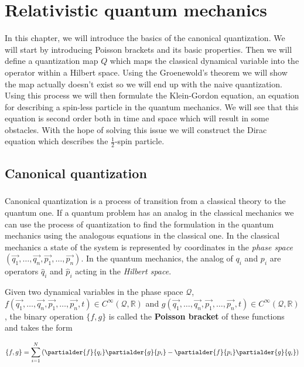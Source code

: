 \chapter{Relativistic quantum mechanics}

In this chapter, we will introduce the basics of the canonical quantization. We will start by introducing
Poisson brackets and its basic properties. Then we will define a quantization map $Q$ which maps the
classical dynamical variable into the operator within a Hilbert space. Using the Groenewold's theorem we
will show the map actually doesn't exist so we will end up with the naive quantization. Using this process we will then
formulate the Klein-Gordon equation, an equation for describing a spin-less particle in the quantum mechanics.
We will see that this equation is second order both in time and space which will result in some obstacles. With the
hope of solving this issue we will construct the Dirac equation which describes the $\frac{1}{2}$-spin particle.

\section{Canonical quantization}

\paragraph{} Canonical quantization is a process of transition from a classical theory to the quantum one. If a 
quantum problem has an analog in the classical mechanics we can use the process of quantization to find the formulation
in the quantum mechanics using the analogous equations in the classical one. In the classical mechanics a state of the system
is represented by coordinates in the \textit{phase space} $(\vec{q_{1}}, \dots, \vec{q_{n}}, \vec{p_{1}}, \dots, \vec{p_{n}})$.
In the quantum mechanics, the analog of $q_{i}$ and $p_{i}$ are operators $\hat{q}_{i}$ and $\hat{p}_{i}$ acting in the 
\textit{Hilbert space}.

\begin{definition}
    \label{df:poisson}
    Given two dynamical variables in the phase space $\mathcal{Q}$, \newline $f(\vec{q_{1}}, \dots, \vec{q_{n}}, \vec{p_{1}}, \dots, \vec{p_{n}}, t) 
    \in C^{\infty}(\mathcal{Q}, \mathbb{R})$ and $g(\vec{q_{1}}, \dots, \vec{q_{n}}, \vec{p_{1}}, \dots, \vec{p_{n}}, t) 
    \in C^{\infty}(\mathcal{Q}, \mathbb{R})$, the binary operation $\{f, g\}$ is called the \textbf{Poisson bracket} of these functions and takes the form

    \begin{equation}
        \{f, g\} = \sum_{i=1}^{N}\left(\partialder{f}{q_{i}} \partialder{g}{p_{i}} - \partialder{f}{p_{i}} \partialder{g}{q_{i}}\right)
    \end{equation}
\end{definition}

